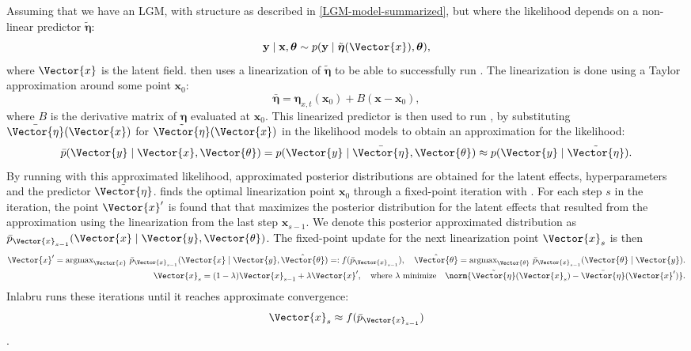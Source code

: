 \newpar Assuming that we have an LGM, with structure as described in \ref{LGM-model-summarized}, but where the likelihood depends on a non-linear predictor $\tilde{\boldsymbol{\eta}}$:
\begin{equation}
    \textbf{y}\mid\textbf{x},\boldsymbol{\theta} \sim p(\textbf{y}\mid \tilde{\boldsymbol{\eta}}(\Vector{x}), \boldsymbol{\theta}),
    \label{Eq:non-linear-predictor}
\end{equation}
where $\Vector{x}$ is the latent field. 
\inlabru then uses a linearization of $\tilde{\boldsymbol{\eta}}$ to be able to successfully run \inla. The linearization is done using a Taylor approximation around some point $\textbf{x}_0$:
\begin{equation}
    \bar{\boldsymbol{\eta}} = \boldsymbol{\eta}_{x,t}(\textbf{x}_0) + B(\textbf{x} - \textbf{x}_0),
\end{equation}
where $B$ is the derivative matrix of $\boldsymbol{\eta}$ evaluated at $\textbf{x}_0$. This linearized predictor is then used to run \inla, by substituting $\bar{\Vector{\eta}}(\Vector{x})$ for $\tilde{\Vector{\eta}}(\Vector{x})$ in the likelihood models to obtain an approximation for the likelihood:
\begin{equation}
    \bar{p}(\Vector{y}\mid \Vector{x}, \Vector{\theta}) = p(\Vector{y}\mid \bar{\Vector{\eta}}, \Vector{\theta}) \approx p(\Vector{y} \mid \tilde{\Vector{\eta}}).
\end{equation}
By running \inla with this approximated likelihood, approximated posterior distributions are obtained for the latent effects, hyperparameters and the predictor $\tilde{\Vector{\eta}}$.
\inlabru finds the optimal linearization point $\textbf{x}_0$ through a fixed-point iteration with \inla. For each step $s$ in the iteration, the point $\Vector{x}'$ is found that that maximizes the posterior distribution for the latent effects that resulted from the \inla approximation using the linearization from the last step $\textbf{x}_{s-1}$. We denote this posterior approximated distribution as $\bar{p}_{\Vector{x}_{s-1}}(\Vector{x}\mid \Vector{y}, \Vector{\theta})$. The fixed-point update for the next linearization point $\Vector{x}_s$ is then 
\begin{equation}
    \begin{aligned}
    \Vector{x}' = \text{argmax}_{\Vector{x}}\,\,\bar{p}_{\Vector{x}_{s-1}}(\Vector{x}\mid \Vector{y}, \hat{\Vector{\theta}}) =: f(\bar{p}_{\Vector{x}_{s-1}}), \quad \hat{\Vector{\theta}} = \text{argmax}_{\Vector{\theta}}\,\,\bar{p}_{\Vector{x}_{s-1}}(\Vector{\theta}\mid \Vector{y}).\\
    \Vector{x}_s = (1 - \lambda)\Vector{x}_{s-1} + \lambda\Vector{x}',\quad \text{where $\lambda$ minimize}\quad \norm{\tilde{\Vector{\eta}}(\Vector{x}_s) - \bar{\Vector{\eta}}(\Vector{x}')}.
    \end{aligned}
\end{equation}
Inlabru runs these iterations until it reaches approximate convergence:
\begin{equation}
\Vector{x}_s \approx f(\bar{p}_{\Vector{x}_{s-1}})
\end{equation}\parencite{Inlabru}.

